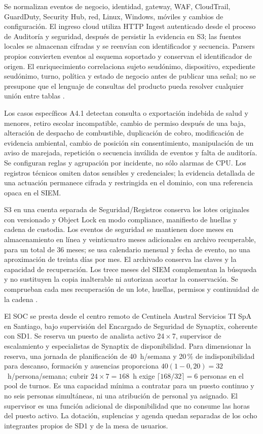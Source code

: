 Se normalizan eventos de negocio, identidad, gateway, WAF, CloudTrail, GuardDuty, Security Hub, red, Linux, Windows, móviles y cambios de configuración. El ingreso cloud utiliza HTTP Ingest autenticado desde el proceso de Auditoría y seguridad, después de persistir la evidencia en S3; las fuentes locales se almacenan cifradas y se reenvían con identificador y secuencia. Parsers propios convierten eventos al esquema soportado y conservan el identificador de origen. El enriquecimiento correlaciona sujeto seudónimo, dispositivo, expediente seudónimo, turno, política y estado de negocio antes de publicar una señal; no se presupone que el lenguaje de consultas del producto pueda resolver cualquier unión entre tablas \parencites{sec-sophos-ingesta,sec-sophos-reglas}.

Los casos específicos A4.1 detectan consulta o exportación indebida de salud y menores, retiro escolar incompatible, cambio de permiso después de una baja, alteración de despacho de combustible, duplicación de cobro, modificación de evidencia ambiental, cambio de posición sin consentimiento, manipulación de un aviso de marejada, repetición o secuencia inválida de eventos y falta de auditoría. Se configuran reglas y agrupación por incidente, no sólo alarmas de CPU. Los registros técnicos omiten datos sensibles y credenciales; la evidencia detallada de una actuación permanece cifrada y restringida en el dominio, con una referencia opaca en el SIEM.

S3 en una cuenta separada de Seguridad/Registros conserva los lotes originales con versionado y Object Lock en modo compliance, manifiesto de huellas y cadena de custodia. Los eventos de seguridad se mantienen doce meses en almacenamiento en línea y veinticuatro meses adicionales en archivo recuperable, para un total de 36 meses; se usa calendario mensual y fecha de evento, no una aproximación de treinta días por mes. El archivado conserva las claves y la capacidad de recuperación. Los trece meses del SIEM complementan la búsqueda y no sustituyen la copia inalterable ni autorizan acortar la conservación. Se comprueban cada mes recuperación de un lote, huellas, permisos y continuidad de la cadena \parencite[RT-11.14, p.~24]{pucv-transversal}.

El SOC se presta desde el centro remoto de Centinela Austral Servicios TI SpA en Santiago, bajo supervisión del Encargado de Seguridad de Synaptix, coherente con SD1. Se reserva un puesto de analista activo 24\,$\times$\,7, supervisor de escalamiento y especialistas de Synaptix de disponibilidad. Para dimensionar la reserva, una jornada de planificación de 40~h/semana y 20\,\% de indisponibilidad para descanso, formación y ausencias proporciona $40(1-0,20)=32$~h/persona/semana; cubrir $24\times7=168$~h exige $\lceil168/32\rceil=6$ personas en el pool de turnos. Es una capacidad mínima a contratar para un puesto continuo y no seis personas simultáneas, ni una atribución de personal ya asignado. El supervisor es una función adicional de disponibilidad que no consume las horas del puesto activo. La dotación, suplencias y agenda quedan separadas de los ocho integrantes propios de SD1 y de la mesa de usuarios.

